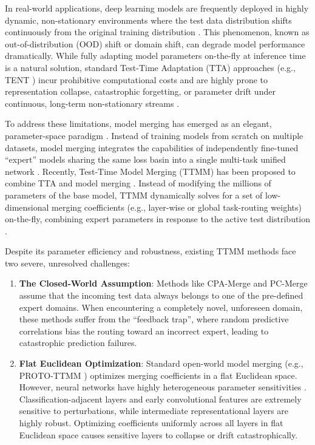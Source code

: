 \documentclass{article}
\theoremstyle{plain}
\theoremstyle{definition}
\theoremstyle{remark}
\begin{document}
In real-world applications, deep learning models are frequently deployed in highly dynamic, non-stationary environments where the test data distribution shifts continuously from the original training distribution \cite{song2023test, dobler2022robustness}. This phenomenon, known as out-of-distribution (OOD) shift or domain shift, can degrade model performance dramatically. While fully adapting model parameters on-the-fly at inference time is a natural solution, standard Test-Time Adaptation (TTA) approaches (e.g., TENT \cite{wang2020tent}) incur prohibitive computational costs and are highly prone to representation collapse, catastrophic forgetting, or parameter drift under continuous, long-term non-stationary streams \cite{zhao2023test, niu2022efficient}.

To address these limitations, model merging has emerged as an elegant, parameter-space paradigm \cite{matena2021merging, wortsman2022model}. Instead of training models from scratch on multiple datasets, model merging integrates the capabilities of independently fine-tuned ``expert'' models sharing the same loss basin into a single multi-task unified network \cite{yadav2023ties, ilharco2022editing}. Recently, Test-Time Model Merging (TTMM) has been proposed to combine TTA and model merging \cite{yang2023adamerging, gandhi2024test}. Instead of modifying the millions of parameters of the base model, TTMM dynamically solves for a set of low-dimensional merging coefficients (e.g., layer-wise or global task-routing weights) on-the-fly, combining expert parameters in response to the active test distribution \cite{du2024learning}.

Despite its parameter efficiency and robustness, existing TTMM methods face two severe, unresolved challenges:
\begin{enumerate}
  \item \textbf{The Closed-World Assumption}: Methods like CPA-Merge \cite{authors2026c} and PC-Merge \cite{authors2026b} assume that the incoming test data always belongs to one of the pre-defined expert domains. When encountering a completely novel, unforeseen domain, these methods suffer from the ``feedback trap'', where random predictive correlations bias the routing toward an incorrect expert, leading to catastrophic prediction failures.
  \item \textbf{Flat Euclidean Optimization}: Standard open-world model merging (e.g., PROTO-TTMM \cite{authors2026a}) optimizes merging coefficients in a flat Euclidean space. However, neural networks have highly heterogeneous parameter sensitivities \cite{kirkpatrick2017overcoming}. Classification-adjacent layers and early convolutional features are extremely sensitive to perturbations, while intermediate representational layers are highly robust. Optimizing coefficients uniformly across all layers in flat Euclidean space causes sensitive layers to collapse or drift catastrophically.
\end{enumerate}
\end{document}
